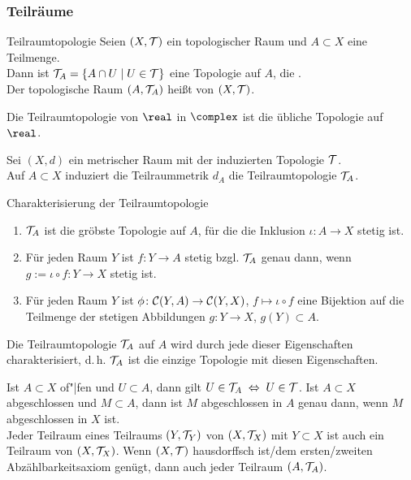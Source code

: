 \subsubsection{%
    Teilräume%
}

\begin{Def}{Teilraumtopologie}
    Seien $(X, \mathcal{T})$ ein topologischer Raum und $A \subset X$ eine Teilmenge. \\
    Dann ist $\mathcal{T}_A = \{A \cap U \;|\; U \in \mathcal{T}\}$ eine Topologie auf $A$,
    die . \\
    Der topologische Raum $(A, \mathcal{T}_A)$ heißt  von $(X, \mathcal{T})$.
\end{Def}

\begin{Bsp}
    Die Teilraumtopologie von $\real$ in $\complex$ ist die übliche Topologie
    auf $\real$.
\end{Bsp}

\begin{Bem}
    Sei $(X, d)$ ein metrischer Raum mit der induzierten Topologie $\mathcal{T}$. \\
    Auf $A \subset X$ induziert die Teilraummetrik $d_A$ die Teilraumtopologie
    $\mathcal{T}_A$.
\end{Bem}

\begin{Satz}{Charakterisierung der Teilraumtopologie}
    \begin{enumerate}
        \item
        $\mathcal{T}_A$ ist die gröbste Topologie auf $A$, für die die Inklusion
        $\iota\colon A \rightarrow X$ stetig ist.
        
        \item
        Für jeden Raum $Y$ ist $f\colon Y \rightarrow A$ stetig bzgl. $\mathcal{T}_A$
        genau dann, wenn $g := \iota \circ f\colon Y \rightarrow X$ stetig ist.
        
        \item
        Für jeden Raum $Y$ ist $\phi\colon \mathcal{C}(Y, A) \rightarrow \mathcal{C}(Y, X)$,
        $f \mapsto \iota \circ f$ eine Bijektion auf die Teilmenge der
        stetigen Abbildungen $g\colon Y \rightarrow X$, $g(Y) \subset A$.
    \end{enumerate}
    Die Teilraumtopologie $\mathcal{T}_A$ auf $A$ wird durch jede dieser Eigenschaften
    charakterisiert, d.\,h. $\mathcal{T}_A$ ist die einzige Topologie mit diesen
    Eigenschaften.
\end{Satz}

\begin{Bem}
    Ist $A \subset X$ of"|fen und $U \subset A$,
    dann gilt $U \in \mathcal{T}_A \;\Leftrightarrow\; U \in \mathcal{T}$.
    Ist $A \subset X$ abgeschlossen und $M \subset A$,
    dann ist $M$ abgeschlossen in $A$ genau dann, wenn $M$ abgeschlossen
    in $X$ ist. \\
    Jeder Teilraum eines Teilraums $(Y, \mathcal{T}_Y)$ von $(X, \mathcal{T}_X)$ mit
    $Y \subset X$ ist auch ein Teilraum von $(X, \mathcal{T}_X)$.
    Wenn $(X, \mathcal{T})$ hausdorffsch ist/dem ersten/zweiten Abzählbarkeitsaxiom
    genügt, dann auch jeder Teilraum $(A, \mathcal{T}_A)$.
\end{Bem}


